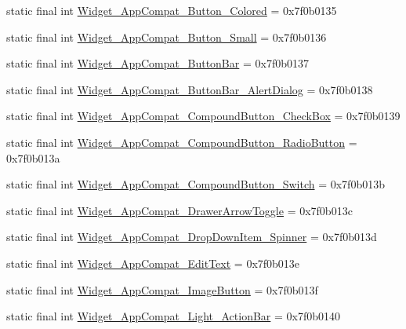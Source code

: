 \begin{CompactItemize}
\item 
static final int \hyperlink{classandroid_1_1support_1_1v7_1_1appcompat_1_1_r_1_1style_e5e0637b5fe16cc59b0d5dd9357c6d4a}{Widget\_\-AppCompat\_\-Button\_\-Colored} = 0x7f0b0135
\item 
static final int \hyperlink{classandroid_1_1support_1_1v7_1_1appcompat_1_1_r_1_1style_3fbff01ab529ba137e9ab7a632b48c3d}{Widget\_\-AppCompat\_\-Button\_\-Small} = 0x7f0b0136
\item 
static final int \hyperlink{classandroid_1_1support_1_1v7_1_1appcompat_1_1_r_1_1style_6cbd1909b0fd67817f076497e53ab7fa}{Widget\_\-AppCompat\_\-ButtonBar} = 0x7f0b0137
\item 
static final int \hyperlink{classandroid_1_1support_1_1v7_1_1appcompat_1_1_r_1_1style_e3a2823f41c01e8d587df184d1ff66c1}{Widget\_\-AppCompat\_\-ButtonBar\_\-AlertDialog} = 0x7f0b0138
\item 
static final int \hyperlink{classandroid_1_1support_1_1v7_1_1appcompat_1_1_r_1_1style_9e6f1d78f52363f0c31b33404edf1673}{Widget\_\-AppCompat\_\-CompoundButton\_\-CheckBox} = 0x7f0b0139
\item 
static final int \hyperlink{classandroid_1_1support_1_1v7_1_1appcompat_1_1_r_1_1style_873feaf4ae6eb1842e65d89a39b25038}{Widget\_\-AppCompat\_\-CompoundButton\_\-RadioButton} = 0x7f0b013a
\item 
static final int \hyperlink{classandroid_1_1support_1_1v7_1_1appcompat_1_1_r_1_1style_7ffc6f7664f2a306d4b37b772f7ed85b}{Widget\_\-AppCompat\_\-CompoundButton\_\-Switch} = 0x7f0b013b
\item 
static final int \hyperlink{classandroid_1_1support_1_1v7_1_1appcompat_1_1_r_1_1style_b2887bebdc8741719aa42db6306fd2c3}{Widget\_\-AppCompat\_\-DrawerArrowToggle} = 0x7f0b013c
\item 
static final int \hyperlink{classandroid_1_1support_1_1v7_1_1appcompat_1_1_r_1_1style_3758364b1cf9ccc7a3bc988d97c81ceb}{Widget\_\-AppCompat\_\-DropDownItem\_\-Spinner} = 0x7f0b013d
\item 
static final int \hyperlink{classandroid_1_1support_1_1v7_1_1appcompat_1_1_r_1_1style_84567a828ddddb7cb738009c78d94891}{Widget\_\-AppCompat\_\-EditText} = 0x7f0b013e
\item 
static final int \hyperlink{classandroid_1_1support_1_1v7_1_1appcompat_1_1_r_1_1style_459bf1dfede7cf6b15120c001a389103}{Widget\_\-AppCompat\_\-ImageButton} = 0x7f0b013f
\item 
static final int \hyperlink{classandroid_1_1support_1_1v7_1_1appcompat_1_1_r_1_1style_51d25da035580b58824050d311ce8c68}{Widget\_\-AppCompat\_\-Light\_\-ActionBar} = 0x7f0b0140

\end{CompactItemize}
